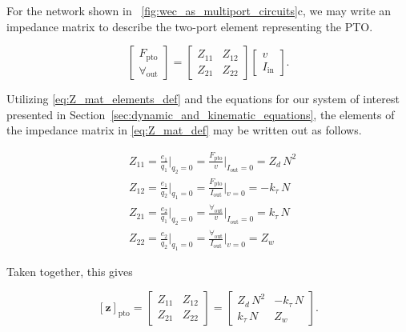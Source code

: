 \documentclass[lettersize,journal]{IEEEtran}
\begin{document}
For the network shown in \figurename~\ref{fig:wec_as_multiport_circuits}c, we may write an impedance matrix to describe the two-port element representing the PTO.

\begin{equation}
        \label{eq:Z_mat_def}
        \begin{bmatrix} 
                F_{\textrm{pto}} \\
                \forall_{\textrm{out}} 
        \end{bmatrix} 
        = 
        \begin{bmatrix} 
                Z_{11} & Z_{12} \\ 
                Z_{21} & Z_{22} 
        \end{bmatrix} 
        \begin{bmatrix} 
                v \\
                I_{\textrm{in}} 
        \end{bmatrix} .
\end{equation}

\noindent{} Utilizing \eqref{eq:Z_mat_elements_def} and the equations for our system of interest presented in Section~\ref{sec:dynamic_and_kinematic_equations}, the elements of the impedance matrix in \eqref{eq:Z_mat_def} may be written out as follows.

\begin{subequations}
        \begin{align}
                &Z_{11} = \frac{e_1}{q_1} \bigg \vert_{q_2=0} 
                = \frac{F_{\textrm{pto}}}{v} \bigg \vert_{I_{\textrm{out}}=0} = Z_d \, N^2 \\[0.5em]
                &Z_{12} = \frac{e_1}{q_2} \bigg \vert_{q_1=0} 
                = \frac{F_{\textrm{pto}}}{I_{\textrm{out}}} \bigg \vert_{v=0} = -k_\tau \, N \\[0.5em]
                &Z_{21} = \frac{e_2}{q_1} \bigg \vert_{q_2=0} 
                = \frac{\forall_{\textrm{out}}}{v} \bigg \vert_{I_{\textrm{out}}=0} = k_\tau \, N \\[0.5em]
                &Z_{22} = \frac{e_2}{q_2} \bigg \vert_{q_1=0} 
                = \frac{\forall_{\textrm{out}}}{I_{\textrm{out}}} \bigg \vert_{v=0} = Z_w 
        \end{align}
\end{subequations}

\noindent{}Taken together, this gives 

 \begin{equation}
        \left[ \mathbf{z} \right]_{\textrm{pto}} 
        = 
        \begin{bmatrix} 
                Z_{11} & Z_{12} \\ 
                Z_{21} & Z_{22} 
        \end{bmatrix}
        =
        \begin{bmatrix} 
        Z_d \, N^2      & -k_\tau \, N  \\
        k_\tau \, N     & Z_w
        \end{bmatrix}.
        \label{eq:pto_impedance}
 \end{equation}
\end{document}
